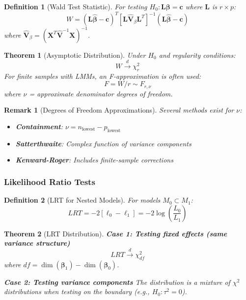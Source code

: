\documentclass{article}
\newtheorem{definition}{Definition}
\newtheorem{theorem}{Theorem}
\newtheorem{remark}{Remark}
\begin{document}
\begin{definition}[Wald Test Statistic]
For testing $H_0: \mathbf{L}\boldsymbol{\beta} = \mathbf{c}$ where $\mathbf{L}$ is $r \times p$:
\begin{equation}
W = (\mathbf{L}\hat{\boldsymbol{\beta}} - \mathbf{c})^T[\mathbf{L}\hat{\mathbf{V}}_{\beta}\mathbf{L}^T]^{-1}(\mathbf{L}\hat{\boldsymbol{\beta}} - \mathbf{c})
\end{equation}
where $\hat{\mathbf{V}}_{\beta} = (\mathbf{X}^T\hat{\mathbf{V}}^{-1}\mathbf{X})^{-1}$.
\end{definition}

\begin{theorem}[Asymptotic Distribution]
Under $H_0$ and regularity conditions:
\begin{equation}
W \xrightarrow{d} \chi^2_r
\end{equation}
For finite samples with LMMs, an F-approximation is often used:
\begin{equation}
F = W/r \sim F_{r,\nu}
\end{equation}
where $\nu$ = approximate denominator degrees of freedom.
\end{theorem}

\begin{remark}[Degrees of Freedom Approximations]
Several methods exist for $\nu$:
\begin{itemize}
    \item \textbf{Containment}: $\nu = n_{\text{lowest}} - p_{\text{lowest}}$
    \item \textbf{Satterthwaite}: Complex function of variance components
    \item \textbf{Kenward-Roger}: Includes finite-sample corrections
\end{itemize}
\end{remark}

\subsubsection{Likelihood Ratio Tests}

\begin{definition}[LRT for Nested Models]
For models $M_0 \subset M_1$:
\begin{equation}
LRT = -2[\ell_0 - \ell_1] = -2\log\left(\frac{L_0}{L_1}\right)
\end{equation}
\end{definition}

\begin{theorem}[LRT Distribution]
\textbf{Case 1: Testing fixed effects (same variance structure)}
\begin{equation}
LRT \xrightarrow{d} \chi^2_{df}
\end{equation}
where $df = \dim(\boldsymbol{\beta}_1) - \dim(\boldsymbol{\beta}_0)$.

\textbf{Case 2: Testing variance components}
The distribution is a mixture of $\chi^2$ distributions when testing on the boundary (e.g., $H_0: \tau^2 = 0$).
\end{theorem}
\end{document}
